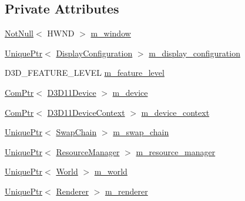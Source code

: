 \subsection*{Private Attributes}
\begin{DoxyCompactItemize}
\item 
\mbox{\hyperlink{namespacemage_a8769f9d670d6b585ea306cb1062af94b}{Not\+Null}}$<$ H\+W\+ND $>$ \mbox{\hyperlink{classmage_1_1rendering_1_1_manager_1_1_impl_a9e08221306f4931b1da16fe5b021a5e8}{m\+\_\+window}}
\item 
\mbox{\hyperlink{namespacemage_a3316d7143a973e37adf1110f2e80ca31}{Unique\+Ptr}}$<$ \mbox{\hyperlink{classmage_1_1rendering_1_1_display_configuration}{Display\+Configuration}} $>$ \mbox{\hyperlink{classmage_1_1rendering_1_1_manager_1_1_impl_aa1a9ba866795d4497a0d43dac4b0188d}{m\+\_\+display\+\_\+configuration}}
\item 
D3\+D\+\_\+\+F\+E\+A\+T\+U\+R\+E\+\_\+\+L\+E\+V\+EL \mbox{\hyperlink{classmage_1_1rendering_1_1_manager_1_1_impl_afdf5967267574a49bba12f5478ba6325}{m\+\_\+feature\+\_\+level}}
\item 
\mbox{\hyperlink{namespacemage_ae74f374780900893caa5555d1031fd79}{Com\+Ptr}}$<$ \mbox{\hyperlink{namespacemage_1_1rendering_a7081b2c6e923fac0d42ff4862dc4a823}{D3\+D11\+Device}} $>$ \mbox{\hyperlink{classmage_1_1rendering_1_1_manager_1_1_impl_aa53fc50439eb2fefbc770440f65eae8a}{m\+\_\+device}}
\item 
\mbox{\hyperlink{namespacemage_ae74f374780900893caa5555d1031fd79}{Com\+Ptr}}$<$ \mbox{\hyperlink{namespacemage_1_1rendering_a4b23dd00d80ca4f6856375936261a13d}{D3\+D11\+Device\+Context}} $>$ \mbox{\hyperlink{classmage_1_1rendering_1_1_manager_1_1_impl_a4d65858be32aeb40527033cb0afd0911}{m\+\_\+device\+\_\+context}}
\item 
\mbox{\hyperlink{namespacemage_a3316d7143a973e37adf1110f2e80ca31}{Unique\+Ptr}}$<$ \mbox{\hyperlink{classmage_1_1rendering_1_1_swap_chain}{Swap\+Chain}} $>$ \mbox{\hyperlink{classmage_1_1rendering_1_1_manager_1_1_impl_a6cdd4855cd9c0681ef0b3a5e4f44ad81}{m\+\_\+swap\+\_\+chain}}
\item 
\mbox{\hyperlink{namespacemage_a3316d7143a973e37adf1110f2e80ca31}{Unique\+Ptr}}$<$ \mbox{\hyperlink{classmage_1_1rendering_1_1_resource_manager}{Resource\+Manager}} $>$ \mbox{\hyperlink{classmage_1_1rendering_1_1_manager_1_1_impl_a3775faa73581e535e207155e4fa09846}{m\+\_\+resource\+\_\+manager}}
\item 
\mbox{\hyperlink{namespacemage_a3316d7143a973e37adf1110f2e80ca31}{Unique\+Ptr}}$<$ \mbox{\hyperlink{classmage_1_1rendering_1_1_world}{World}} $>$ \mbox{\hyperlink{classmage_1_1rendering_1_1_manager_1_1_impl_ad262b9528ae867db6fe8b93b8de54cf1}{m\+\_\+world}}
\item 
\mbox{\hyperlink{namespacemage_a3316d7143a973e37adf1110f2e80ca31}{Unique\+Ptr}}$<$ \mbox{\hyperlink{classmage_1_1rendering_1_1_renderer}{Renderer}} $>$ \mbox{\hyperlink{classmage_1_1rendering_1_1_manager_1_1_impl_aa15b0df6ab64a8c03cd4aa23cb78adb4}{m\+\_\+renderer}}
\end{DoxyCompactItemize}


